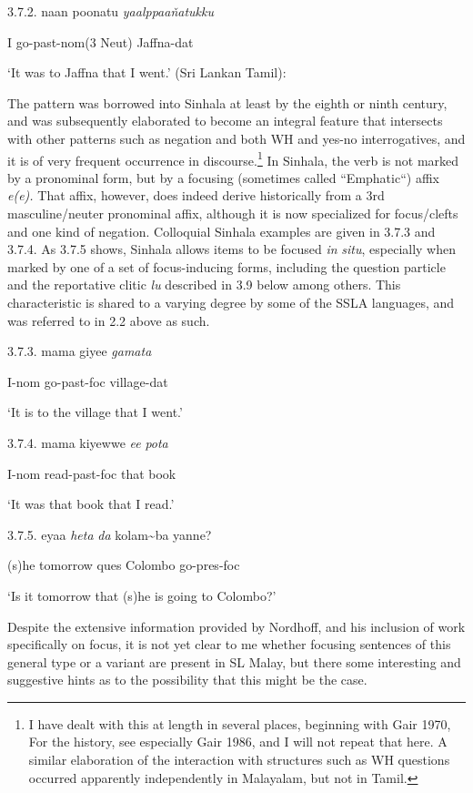 \documentclass[letterpaper]{article}
\begin{document}
 3.7.2.
\ea
\gll  naan poonatu  \textit{yaal}\textit{{\dag}{\dag}}\textit{ppaan{\v{}}atukku}

  I  go-past-nom(3 Neut) Jaffna-dat

  `It was to Jaffna that I went.'  (Sri Lankan Tamil):

 The pattern was borrowed into Sinhala at least by the eighth or ninth century, and was subsequently elaborated to become an integral feature that intersects with other patterns such as negation and both WH and yes-no interrogatives, and it is of very frequent occurrence in discourse.\footnote{I
  have dealt with this at length in several places, beginning with Gair 1970, For the history, see especially Gair 1986, and I will not repeat that here. A similar elaboration of the interaction with structures such as WH questions occurred apparently independently in Malayalam, but not in Tamil.}  In Sinhala, the verb is not marked by a pronominal form, but by a focusing (sometimes called ``Emphatic``) affix \textit{e(e).} That affix, however, does indeed derive historically from a 3rd masculine/neuter pronominal affix, although it is now specialized for focus/clefts and one kind of negation. Colloquial Sinhala examples are given in 3.7.3 and 3.7.4. As 3.7.5 shows, Sinhala allows items to be focused \textit{in} \textit{situ}, especially when marked by one of a set of focus-inducing forms, including the question particle and the reportative clitic \textit{lu} described in 3.9 below among others. This characteristic is shared to a varying degree by some of the SSLA languages, and was referred to in 2.2 above as such.

 3.7.3. 
\ea
\gll mama giyee \textit{gamat}\textit{{\dag}}\textit{a} 

  I-nom go-past-foc village-dat

  `It is to the village that I went.'

 3.7.4. 
\ea
\gll mama kiyewwe \textit{ee} \textit{pota} 

  I-nom read-past-foc that book 

   `It was that book that I read.'

 3.7.5.
\ea
\gll  eyaa \textit{het}\textit{{\dag}}\textit{a} \textit{da} kolam{\~{}}ba yanne?

  (s)he tomorrow ques Colombo go-pres-foc

  `Is it tomorrow that (s)he is going to Colombo?'

 Despite the extensive information provided by Nordhoff, and his inclusion of work specifically on focus, it is not yet clear to me whether focusing sentences of this general type or a variant are present in SL Malay, but there some interesting and suggestive hints as to the possibility that this might be the case.
\end{document}
